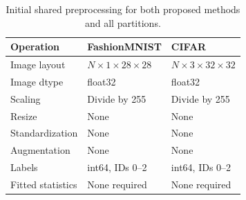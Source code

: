 \begin{table}[ht]
\centering
\caption{Initial shared preprocessing for both proposed methods and all partitions.}
\label{tab:preprocessing}
\begin{tabular}{lll}
\hline
Operation & FashionMNIST & CIFAR \\
\hline
Image layout & $N\times1\times28\times28$ & $N\times3\times32\times32$ \\
Image dtype & float32 & float32 \\
Scaling & Divide by 255 & Divide by 255 \\
Resize & None & None \\
Standardization & None & None \\
Augmentation & None & None \\
Labels & int64, IDs 0--2 & int64, IDs 0--2 \\
Fitted statistics & None required & None required \\
\hline
\end{tabular}
\end{table}
